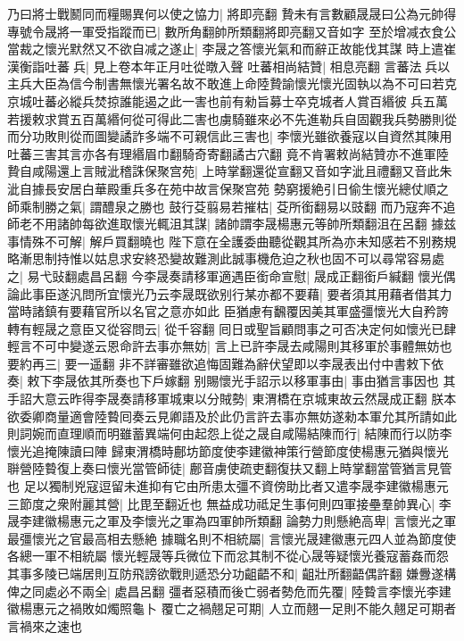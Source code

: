 乃曰將士戰鬭同而糧賜異何以使之恊力|{
	將即亮翻}
贄未有言數顧晟晟曰公為元帥得專號令晟將一軍受指蹤而已|{
	數所角翻帥所類翻將即亮翻又音如字}
至於增减衣食公當裁之懷光默然又不欲自减之遂止|{
	李晟之答懷光氣和而辭正故能伐其謀}
時上遣崔漢衡詣吐蕃兵|{
	見上卷本年正月吐從暾入聲}
吐蕃相尚結贊|{
	相息亮翻}
言蕃法兵以主兵大臣為信今制書無懷光署名故不敢進上命陸贄諭懷光懷光固執以為不可曰若克京城吐蕃必縱兵焚掠誰能遏之此一害也前有勑旨募士卒克城者人賞百緡彼兵五萬若援敕求賞五百萬緡何從可得此二害也虜騎雖來必不先進勒兵自固觀我兵勢勝則從而分功敗則從而圖變譎詐多端不可親信此三害也|{
	李懷光雖欲養寇以自資然其陳用吐蕃三害其言亦各有理緡眉巾翻騎奇寄翻譎古穴翻}
竟不肯署敕尚結贊亦不進軍陸贄自咸陽還上言賊泚稽誅保聚宫苑|{
	上時掌翻還從宣翻又音如字泚且禮翻又音此朱泚自據長安居白華殿重兵多在苑中故言保聚宫苑}
勢窮援絶引日偷生懷光總仗順之師乘制勝之氣|{
	謂醴泉之勝也}
鼓行芟翦易若摧枯|{
	芟所銜翻易以豉翻}
而乃寇奔不追師老不用諸帥每欲進取懷光輒沮其謀|{
	諸帥謂李晟楊惠元等帥所類翻沮在呂翻}
據兹事情殊不可解|{
	解戶買翻曉也}
陛下意在全護委曲聽從觀其所為亦未知感若不别務規略漸思制持惟以姑息求安終恐變故難測此誠事機危迫之秋也固不可以尋常容易處之|{
	易弋䜴翻處昌呂翻}
今李晟奏請移軍適遇臣銜命宣慰|{
	晟成正翻銜戶緘翻}
懷光偶論此事臣遂汎問所宜懷光乃云李晟既欲别行某亦都不要藉|{
	要者須其用藉者借其力當時諸鎮有要藉官所以名官之意亦如此}
臣猶慮有飜覆因美其軍盛彊懷光大自矜誇轉有輕晟之意臣又從容問云|{
	從千容翻}
囘日或聖旨顧問事之可否决定何如懷光已肆輕言不可中變遂云恩命許去事亦無妨|{
	言上已許李晟去咸陽則其移軍於事體無妨也}
要約再三|{
	要一遥翻}
非不詳審雖欲追悔固難為辭伏望即以李晟表出付中書敕下依奏|{
	敕下李晟依其所奏也下戶嫁翻}
别賜懷光手詔示以移軍事由|{
	事由猶言事因也}
其手詔大意云昨得李晟奏請移軍城東以分賊勢|{
	東渭橋在京城東故云然晟成正翻}
朕本欲委卿商量適會陸䞇囘奏云見卿語及於此仍言許去事亦無妨遂勑本軍允其所請如此則詞婉而直理順而明雖蓄異端何由起怨上從之晟自咸陽結陳而行|{
	結陳而行以防李懷光追掩陳讀曰陣}
歸東渭橋時鄜坊節度使李建徽神策行營節度使楊惠元猶與懷光聨營陸䞇復上奏曰懷光當管師徒|{
	鄜音虜使疏吏翻復扶又翻上時掌翻當管猶言見管也}
足以獨制兇寇逗留未進抑有它由所患太彊不資傍助比者又遣李晟李建徽楊惠元三節度之衆附麗其營|{
	比毘至翻近也}
無益成功祗足生事何則四軍接壘羣帥異心|{
	李晟李建徽楊惠元之軍及李懷光之軍為四軍帥所類翻}
論勢力則懸絶高卑|{
	言懷光之軍最彊懷光之官最高相去懸絶}
據職名則不相統屬|{
	言懷光晟建徽惠元四人並為節度使各總一軍不相統屬}
懷光輕晟等兵微位下而忿其制不從心晟等疑懷光養寇蓄姦而怨其事多陵已端居則互防飛謗欲戰則遞恐分功齟齬不和|{
	齟壯所翻齬偶許翻}
嫌釁遂構俾之同處必不兩全|{
	處昌呂翻}
彊者惡積而後亡弱者勢危而先覆|{
	陸䞇言李懷光李建徽楊惠元之禍敗如燭照龜卜}
覆亡之禍翹足可期|{
	人立而翹一足則不能久翹足可期者言禍來之速也}
